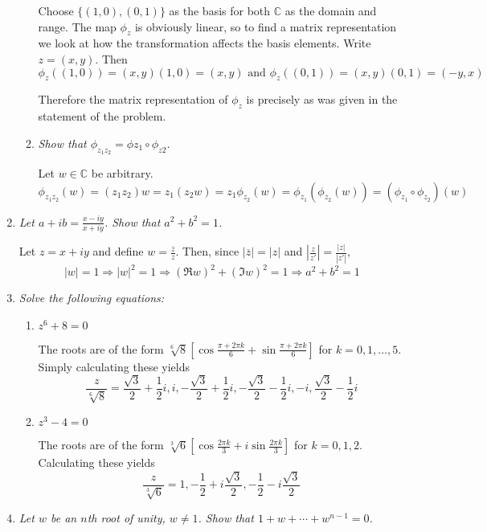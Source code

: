 \documentclass[letterpaper, 11pt]{article}
\begin{document}
\begin{enumerate}
\begin{enumerate}
Choose $\{(1,0), (0,1)\}$ as the basis for both $\mathbb{C}$ as the domain and range.  The map $\phi_z$ is obviously linear, so to find a matrix representation we look at how the transformation affects the basis elements.  Write $z = (x,y)$.  Then
\[
\phi_z\left((1,0)\right) = (x,y)(1,0) = (x,y) \mbox{ and } \phi_z\left((0,1)\right) = (x,y)(0,1) = (-y,x)
\]

Therefore the matrix representation of $\phi_z$ is precisely as was given in the statement of the problem.
\item \emph{Show that $\phi_{z_1z_2} = \phi{z_1} \circ \phi_{z2}$.}

Let $w \in \mathbb{C}$ be arbitrary.
\[
\phi_{z_1z_2}(w) = (z_1z_2)w = z_1(z_2w) = z_1\phi_{z_2}(w) = \phi_{z_1}(\phi_{z_2}(w)) = (\phi_{z_1} \circ \phi_{z_2})(w)
\]
\end{enumerate}

\item \emph{Let $a+ib = \frac{x-iy}{x+iy}$.  Show that $a^2 + b^2 = 1$.}

Let $z = x+iy$ and define $w = \frac{\overline{z}}{z}$.  Then, since $|\overline{z}| = |z|$ and $\left| \frac{z}{z'} \right| = \frac{|z|}{|z'|}$,
\[
|w| = 1 \Rightarrow |w|^2 = 1 \Rightarrow \left(\Re w\right)^2 + \left(\Im w\right)^2 = 1 \Rightarrow a^2 + b^2 = 1
\]

\item \emph{Solve the following equations:}
\begin{enumerate}
\item \emph{$z^6 + 8 = 0$}

The roots are of the form $\sqrt[6]{8}\left[\cos\frac{\pi + 2\pi k}{6} + \sin\frac{\pi + 2\pi k}{6}\right]$ for $k=0,1,\ldots,5$.  Simply calculating these yields
\[
\frac{z}{\sqrt[6]{8}} = \frac{\sqrt{3}}{2} + \frac{1}{2}i, i, -\frac{\sqrt{3}}{2} + \frac{1}{2}i, -\frac{\sqrt{3}}{2} - \frac{1}{2}i, -i, \frac{\sqrt{3}}{2} - \frac{1}{2}i
\]

\item \emph{$z^3 - 4 = 0$}

The roots are of the form $\sqrt[3]{6}\left[\cos\frac{2\pi k}{3} + i\sin\frac{2\pi k}{3}\right]$ for $k=0,1,2$.  Calculating these yields
\[
\frac{z}{\sqrt[3]{6}} = 1, -\frac{1}{2} + i\frac{\sqrt{3}}{2}, -\frac{1}{2} - i\frac{\sqrt{3}}{2}
\]
\end{enumerate}

\item \emph{Let $w$ be an $n$th root of unity, $w \neq 1$.  Show that $1 + w + \cdots + w^{n-1} = 0$.}


\end{enumerate}
\end{document}
